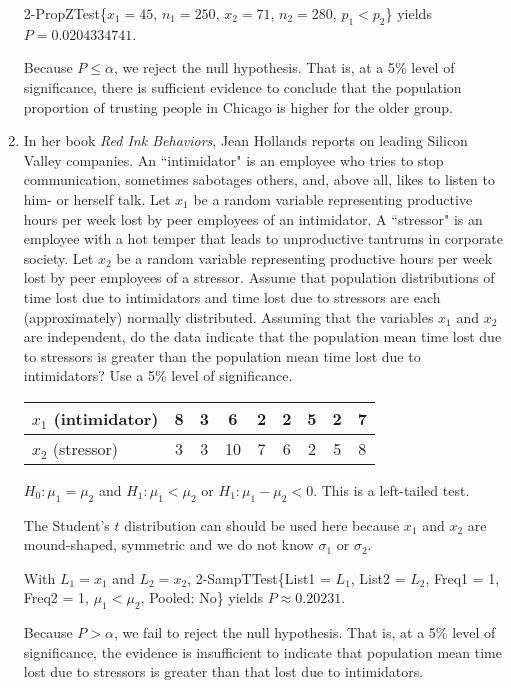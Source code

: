 \documentclass{article}
\newcommand{\answer}[1]{\color{red}#1}
\begin{document}
\begin{enumerate}
{ 2-PropZTest\{$x_1 = 45$, $n_1 = 250$, $x_2 = 71$, $n_2 = 280$, $p_1 < p_2$\}  yields $P = 0.0204334741$.  

Because $P \leq \alpha$, we reject the null hypothesis. That is, at a 5\% level of significance, there is sufficient evidence to conclude that the population proportion of trusting people in Chicago is higher for the older group.  
} 
 
\vfill

\newpage

\item In her book {\em Red Ink Behaviors}, Jean Hollands reports on leading Silicon Valley companies. An ``intimidator" is an employee who tries to stop communication, sometimes sabotages others, and, above all, likes to listen to him- or herself talk. Let $x_1$ be a random variable representing productive hours per week lost by peer employees of an intimidator. A ``stressor" is an employee with a hot temper that leads to unproductive tantrums in corporate society.  Let $x_2$ be a random variable representing productive hours per week lost by peer employees of a stressor. Assume that population distributions of time lost due to intimidators and time lost due to stressors are each (approximately) normally distributed. 
Assuming that the variables $x_1$ and $x_2$ are independent, do the data indicate that the population mean time lost due to stressors is greater than the population mean time lost due to intimidators?  Use a 5\% level of significance.
\begin{center} 
\begin{tabular}{l|cccccccc}
$x_1$  (intimidator)    & 8 & 3 & 6  & 2 & 2 & 5 & 2 & 7 \\
\hline
$x_2$  (stressor)       & 3 & 3 & 10 & 7 & 6 & 2 & 5 & 8 
\end{tabular}
\end{center}


{\answer
 $H_0: \mu_1 = \mu_2$ and $H_1: \mu_1 < \mu_2$ or  $H_1: \mu_1 - \mu_2 < 0$. This is a left-tailed test.   
	
The Student's $t$ distribution can should be used here because $x_1$ and $x_2$ are mound-shaped, symmetric and we do not know $\sigma_1$ or $\sigma_2$.  

With $L_1 = x_1$ and $L_2 = x_2$,  2-SampTTest\{List1 = $L_1$, List2 = $L_2$, Freq1 = 1, Freq2 = 1, $\mu_1 < \mu_2$, Pooled: No\} yields $P \approx 0.20231$.  
	
Because $P > \alpha$, we fail to reject the null hypothesis.  That is, at a 5\% level of significance, the evidence is insufficient to indicate that population mean time lost due to stressors is greater than that lost due to intimidators.  
} 
 


\end{enumerate}
\vfill
\end{document}
